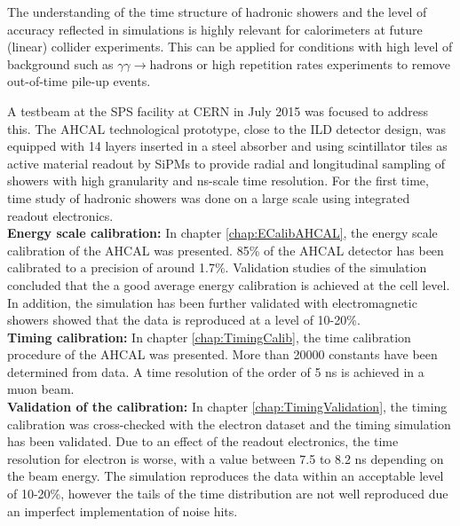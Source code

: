 The understanding of the time structure of hadronic showers and the level of accuracy reflected in \geant simulations is highly relevant for calorimeters at future (linear) collider experiments. This can be applied for conditions with high level of background such as $\gamma\gamma \rightarrow \text{hadrons}$ or high repetition rates experiments to remove out-of-time pile-up events.

A testbeam at the SPS facility at CERN in July 2015 was focused to address this. The AHCAL technological prototype, close to the ILD detector design, was equipped with 14 layers inserted in a steel absorber and using scintillator tiles as active material readout by SiPMs to provide radial and longitudinal sampling of showers with high granularity and ns-scale time resolution. For the first time, time study of hadronic showers was done on a large scale using integrated readout electronics.\\[0.1cm]

\noindent\textbf{Energy scale calibration:} In chapter \ref{chap:ECalibAHCAL}, the energy scale calibration of the AHCAL was presented. 85\% of the AHCAL detector has been calibrated to a precision of around 1.7\%. Validation studies of the simulation concluded that the a good average energy calibration is achieved at the cell level. In addition, the simulation has been further validated with electromagnetic showers showed that the data is reproduced at a level of 10-20\%.\\[0.1cm]

\noindent\textbf{Timing calibration:} In chapter \ref{chap:TimingCalib}, the time calibration procedure of the AHCAL was presented. More than 20000 constants have been determined from data. A time resolution of the order of 5 ns is achieved in a muon beam.\\[0.1cm]

\noindent\textbf{Validation of the calibration:} In chapter \ref{chap:TimingValidation}, the timing calibration was cross-checked with the electron dataset and the timing simulation has been validated. Due to an effect of the readout electronics, the time resolution for electron is worse, with a value between 7.5 to 8.2 ns depending on the beam energy. The simulation reproduces the data within an acceptable level of 10-20\%, however the tails of the time distribution are not well reproduced due an imperfect implementation of noise hits.\\[0.1cm]

